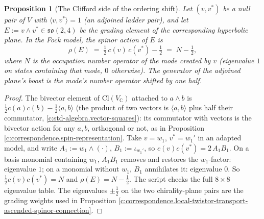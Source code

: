 \documentclass[11pt]{article}
\newtheorem{proposition}[theorem]{Proposition}
\theoremstyle{definition}
\theoremstyle{plain}
\providecommand{\C}{}\renewcommand{\C}{\mathbb{C}}
\providecommand{\Cl}{}\renewcommand{\Cl}{\mathrm{Cl}}
\providecommand{\ip}{}\renewcommand{\ip}[2]{\langle #1, #2\rangle}
\begin{document}
\begin{proposition}[The Clifford side of the ordering shift]\label{c:correspondence.clifford-side-ordering-shift}
Let $(v, v^*)$ be a null pair of $V$ with $\ip{v}{v^*} = 1$ (an adjoined ladder pair), and let $E := v\wedge v^* \in \mathfrak{so}(2,4)$ be the grading element of the corresponding hyperbolic plane. In the Fock model, the spinor action of $E$ is
\[
\rho(E) \;=\; \tfrac12\,c(v)\,c(v^*) - \tfrac12 \;=\; N - \tfrac12 ,
\]
where $N$ is the occupation number operator of the mode created by $v$ (eigenvalue $1$ on states containing that mode, $0$ otherwise). The generator of the adjoined plane's boost is the mode's number operator shifted by one half.
\end{proposition}
\begin{proof}
The bivector element of $\Cl(V_\C)$ attached to $a\wedge b$ is $\tfrac12 c(a)c(b) - \tfrac12\ip{a}{b}$ (the product of two vectors is $\ip{a}{b}$ plus half their commutator, \ref{c:std-algebra.vector-squares}): its commutator with vectors is the bivector action for any $a, b$, orthogonal or not, as in Proposition \ref{c:correspondence.spin-representation}. Take $v = w_1$, $v^* = w_1'$ in an adapted model, and write $A_1 := w_1\wedge(\cdot)$, $B_1 := \iota_{w_1'}$, so $c(v)c(v^*) = 2\,A_1 B_1$. On a basis monomial containing $w_1$, $A_1B_1$ removes and restores the $w_1$-factor: eigenvalue $1$; on a monomial without $w_1$, $B_1$ annihilates it: eigenvalue $0$. So $\tfrac12 c(v)c(v^*) = N$ and $\rho(E) = N - \tfrac12$. The script checks the full $8\times 8$ eigenvalue table. The eigenvalues $\pm\tfrac12$ on the two chirality-plane pairs are the grading weights used in Proposition \ref{c:correspondence.local-twistor-transport-ascended-spinor-connection}.

\end{proof}
\end{document}

